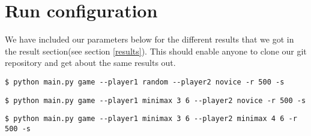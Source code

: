 \appendix
\lstset{language=bash, frame=single, breaklines=true}
\section{Run configuration}\label{run configuration}
We have included our parameters below for the different results that we got
in the result section(see section \ref{results}). This should enable anyone to clone
our git repository and get about the same results out.

\begin{lstlisting}[label=lst:novice vs random, caption=Novice compared to random
player with 500 games]
$ python main.py game --player1 random --player2 novice -r 500 -s
\end{lstlisting}

\begin{lstlisting}[label=lst:novice vs minimax, caption=Novice compared to
minimax player with 500 games]
$ python main.py game --player1 minimax 3 6 --player2 novice -r 500 -s
\end{lstlisting}

\begin{lstlisting}[label=lst:minimax3 vs minimax4, caption=Minimax with a
depth of 4 compared to a minimax player with a depth of 3]
$ python main.py game --player1 minimax 3 6 --player2 minimax 4 6 -r 500 -s
\end{lstlisting}


